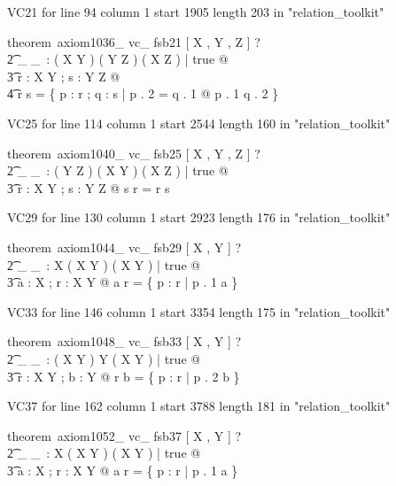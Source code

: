 \documentclass{article}
\begin{document}
VC21 for line 94 column 1 start 1905 length 203 in "relation_toolkit"
\begin{zed}
theorem~axiom1036\_ vc\_ fsb21 [ X , Y , Z ] \vdash ? \\
   \t2 \exists \_ \comp \_~: ( X \rel Y ) \cross ( Y \rel Z ) \fun ( X \rel Z ) | true @ \\
    \t3 \forall r : X \rel Y ; s : Y \rel Z @ \\
     \t4 r \comp s = \{ p : r ; q : s | p . 2 = q . 1 @ p . 1 \mapsto q . 2 \}
\end{zed}

VC25 for line 114 column 1 start 2544 length 160 in "relation_toolkit"
\begin{zed}
theorem~axiom1040\_ vc\_ fsb25 [ X , Y , Z ] \vdash ? \\
   \t2 \exists \_ \circ \_~: ( Y \rel Z ) \cross ( X \rel Y ) \fun ( X \rel Z ) | true @ \\
    \t3 \forall r : X \rel Y ; s : Y \rel Z @ s \circ r = r \comp s
\end{zed}

VC29 for line 130 column 1 start 2923 length 176 in "relation_toolkit"
\begin{zed}
theorem~axiom1044\_ vc\_ fsb29 [ X , Y ] \vdash ? \\
   \t2 \exists \_ \dres \_~: \power X \cross ( X \rel Y ) \fun ( X \rel Y ) | true @ \\
    \t3 \forall a : \power X ; r : X \rel Y @ a \dres r = \{ p : r | p . 1 \in a \}
\end{zed}

VC33 for line 146 column 1 start 3354 length 175 in "relation_toolkit"
\begin{zed}
theorem~axiom1048\_ vc\_ fsb33 [ X , Y ] \vdash ? \\
   \t2 \exists \_ \rres \_~: ( X \rel Y ) \cross \power Y \fun ( X \rel Y ) | true @ \\
    \t3 \forall r : X \rel Y ; b : \power Y @ r \rres b = \{ p : r | p . 2 \in b \}
\end{zed}

VC37 for line 162 column 1 start 3788 length 181 in "relation_toolkit"
\begin{zed}
theorem~axiom1052\_ vc\_ fsb37 [ X , Y ] \vdash ? \\
   \t2 \exists \_ \ndres \_~: \power X \cross ( X \rel Y ) \fun ( X \rel Y ) | true @ \\
    \t3 \forall a : \power X ; r : X \rel Y @ a \ndres r = \{ p : r | p . 1 \notin a \}
\end{zed}
\end{document}
